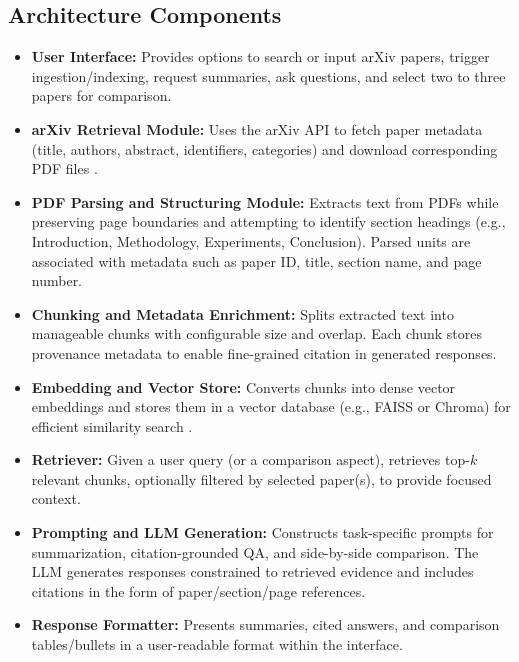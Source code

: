 \subsection{Architecture Components}
\begin{itemize}
    \item \textbf{User Interface:} Provides options to search or input arXiv papers, trigger ingestion/indexing, request summaries, ask questions, and select two to three papers for comparison.
    \item \textbf{arXiv Retrieval Module:} Uses the arXiv API to fetch paper metadata (title, authors, abstract, identifiers, categories) and download corresponding PDF files \cite{b12}.
    \item \textbf{PDF Parsing and Structuring Module:} Extracts text from PDFs while preserving page boundaries and attempting to identify section headings (e.g., Introduction, Methodology, Experiments, Conclusion). Parsed units are associated with metadata such as paper ID, title, section name, and page number.
    \item \textbf{Chunking and Metadata Enrichment:} Splits extracted text into manageable chunks with configurable size and overlap. Each chunk stores provenance metadata to enable fine-grained citation in generated responses.
    \item \textbf{Embedding and Vector Store:} Converts chunks into dense vector embeddings and stores them in a vector database (e.g., FAISS or Chroma) for efficient similarity search \cite{b10,b11}.
    \item \textbf{Retriever:} Given a user query (or a comparison aspect), retrieves top-$k$ relevant chunks, optionally filtered by selected paper(s), to provide focused context.
    \item \textbf{Prompting and LLM Generation:} Constructs task-specific prompts for summarization, citation-grounded QA, and side-by-side comparison. The LLM generates responses constrained to retrieved evidence and includes citations in the form of paper/section/page references.
    \item \textbf{Response Formatter:} Presents summaries, cited answers, and comparison tables/bullets in a user-readable format within the interface.
\end{itemize}

